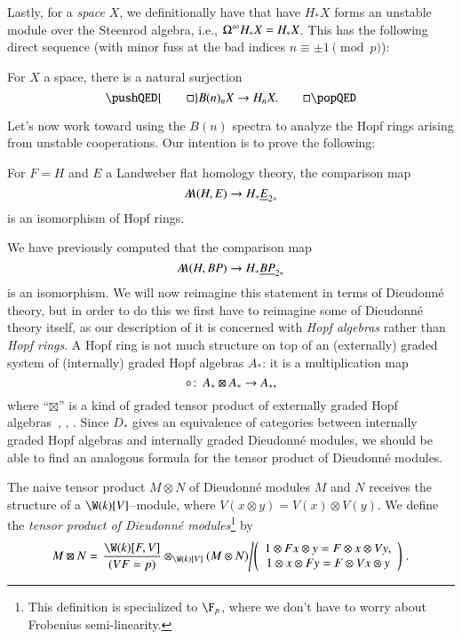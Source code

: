 Lastly, for a \emph{space} $X$, we definitionally have that have $H_* X$ forms an unstable module over the Steenrod algebra, i.e., $\Omega^\infty H_* X = H_* X$.  This has the following direct sequence (with minor fuss at the bad indices $n \equiv \pm 1 \pmod p$):

\begin{lemma}
For $X$ a space, there is a natural surjection
\[\pushQED{\qed}
B(n)_n X \to H_n X. \qedhere
\popQED\]
\end{lemma}



Let's now work toward using the $B(n)$ spectra to analyze the Hopf rings arising from unstable cooperations.  Our intention is to prove the following:
\begin{theorem}\label{LEFTUnstableCooperations}
For $F = H$ and $E$ a Landweber flat homology theory, the comparison map \[A\!\!A(H, E) \to H_* \underline{\smash{E}}_{2*}\] is an isomorphism of Hopf rings.
\end{theorem}
\noindent We have previously computed that the comparison map \[A\!\!A(H, BP) \to H_* \underline{\smash{BP}}_{2*}\] is an isomorphism.  We will now reimagine this statement in terms of Dieudonn\'e theory, but in order to do this we first have to reimagine some of Dieudonn\'e theory itself, as our description of it is concerned with \emph{Hopf algebras} rather than \emph{Hopf rings}.  A Hopf ring is not much structure on top of an (externally) graded system of (internally) graded Hopf algebras $A_*$: it is a multiplication map \[\circ\colon\thinspace A_* \boxtimes A_* \to A_*,\] where ``$\boxtimes$'' is a kind of graded tensor product of externally graded Hopf algebras~\cite[Proposition 2.6]{HuntonTurner}, \cite[Definition 2.2]{BuchstaberLazarev}, \cite[Section 5]{GoerssDieudonne}.  Since $D_*$ gives an equivalence of categories between internally graded Hopf algebras and internally graded Dieudonn\'e modules, we should be able to find an analogous formula for the tensor product of Dieudonn\'e modules.

\begin{definition}{\cite[pg.\ 154]{GoerssDieudonne}}
The naive tensor product $M \otimes N$ of Dieudonn\'e modules $M$ and $N$ receives the structure of a $\W(k)[V]$--module, where $V(x \otimes y) = V(x) \otimes V(y)$.  We define the \textit{tensor product of Dieudonn\'e modules}\footnote{This definition is specialized to $\F_p$, where we don't have to worry about Frobenius semi-linearity.} by \[M \boxtimes N = \left.\frac{\W(k)[F, V]}{(VF = p)} \otimes_{\W(k)[V]} (M \otimes N) \middle/ \left( \begin{array}{c} 1 \otimes Fx \otimes y = F \otimes x \otimes Vy, \\ 1 \otimes x \otimes Fy = F \otimes Vx \otimes y \end{array} \right) \right. .\]
\end{definition}

